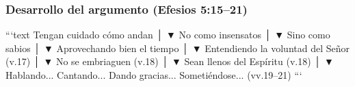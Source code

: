 \documentclass[11pt]{article}
\begin{document}
\subsubsection{Desarrollo del argumento (Efesios
5:15--21)}\label{desarrollo-del-argumento-efesios-51521}

\begin{verseblock}
```text Tengan cuidado cómo andan         │         ▼ No como insensatos         │         ▼ Sino como sabios         │         ▼ Aprovechando bien el tiempo         │         ▼ Entendiendo la voluntad del Señor (v.17)         │         ▼ No se embriaguen (v.18)         │         ▼ Sean llenos del Espíritu (v.18)         │         ▼ Hablando... Cantando... Dando gracias... Sometiéndose... (vv.19–21) ```
\end{verseblock}
\end{document}
